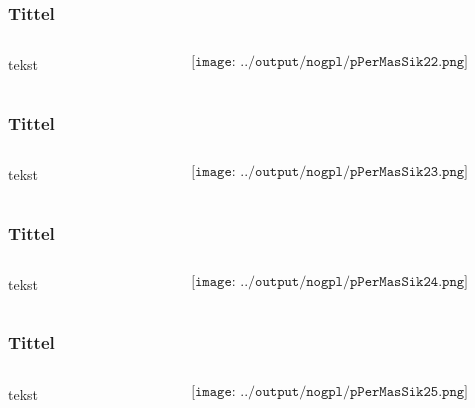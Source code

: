 \documentclass[aspectratio=169,xcolor=dvipsnames]{beamer}
\begin{document}
\begin{frame}
	\frametitle{Tittel}
	\begin{columns}
		\begin{column}{0.5\textwidth}
tekst
			
		\end{column}

		\begin{column}{0.5\textwidth}
	$$\texttt{[image: ../output/nogpl/pPerMasSik22.png]}$$
		\end{column}
	\end{columns}
\end{frame}

\begin{frame}
	\frametitle{Tittel}
	\begin{columns}
		\begin{column}{0.5\textwidth}
tekst
			
		\end{column}

		\begin{column}{0.5\textwidth}
	$$\texttt{[image: ../output/nogpl/pPerMasSik23.png]}$$
		\end{column}
	\end{columns}
\end{frame}

\begin{frame}
	\frametitle{Tittel}
	\begin{columns}
		\begin{column}{0.5\textwidth}
tekst
			
		\end{column}

		\begin{column}{0.5\textwidth}
	$$\texttt{[image: ../output/nogpl/pPerMasSik24.png]}$$
		\end{column}
	\end{columns}
\end{frame}

\begin{frame}
	\frametitle{Tittel}
	\begin{columns}
		\begin{column}{0.5\textwidth}
tekst
			
		\end{column}

		\begin{column}{0.5\textwidth}
	$$\texttt{[image: ../output/nogpl/pPerMasSik25.png]}$$
		\end{column}
	\end{columns}
\end{frame}
\end{document}
